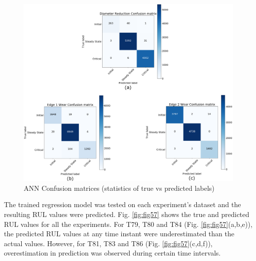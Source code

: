 \documentclass[preprint,review,12pt]{elsarticle}
\begin{document}
\begin{figure}[!h]
  \begin{center}
    \includegraphics[width=\linewidth]{56.png}
    \caption{ANN Confusion matrices (statistics of true vs predicted labels)}\label{fig:fig56}
  \end{center}
\end{figure}

The trained regression model was tested on each experiment's dataset and the resulting RUL values were predicted. Fig. \ref{fig:fig57} shows the true and predicted RUL values for all the experiments. For T79, T80 and T84 (Fig. \ref{fig:fig57}(a,b,e)), the predicted RUL values at any time instant were underestimated than the actual values. However, for T81, T83 and T86 (Fig. \ref{fig:fig57}(c,d,f)), overestimation in prediction was observed during certain time intervals. \par
\end{document}
